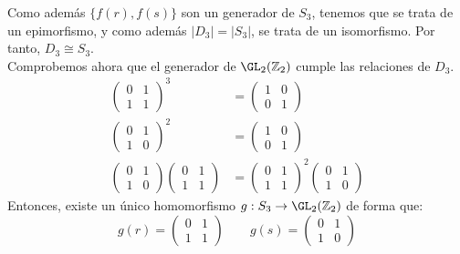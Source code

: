 \begin{ejercicio}
    Como además $\{f(r),f(s)\}$ son un generador de $S_3$, tenemos que se trata de un epimorfismo, y como además $|D_3|=|S_3|$, se trata de un isomorfismo. Por tanto, $D_3\cong S_3$.\\

    Comprobemos ahora que el generador de $\GL_2(\mathbb{Z}_2)$ cumple las relaciones de $D_3$.
    \begin{align*}
        {\left(\begin{array}{cc}
            0 & 1 \\
            1 & 1 
        \end{array}\right)}^{3} &= \left(\begin{array}{cc}
            1 & 0 \\
            0 & 1 
        \end{array}\right) \\
        {\left(\begin{array}{cc}
            0 & 1 \\
            1 & 0 
        \end{array}\right)}^2 &= \left(\begin{array}{cc}
            1 & 0 \\
            0 & 1 
        \end{array}\right) \\
        \left(\begin{array}{cc}
            0 & 1 \\
            1 & 0 
        \end{array}\right)\left(\begin{array}{cc}
            0 & 1 \\
            1 & 1 
            \end{array}\right) &= {\left(\begin{array}{cc}
            0 & 1 \\
            1 & 1 
        \end{array}\right)}^2 \left(\begin{array}{cc}
            0 & 1 \\
            1 & 0 
        \end{array}\right)
    \end{align*}
    Entonces, existe un único homomorfismo $g:S_3\to \GL_2(\mathbb{Z}_2)$ de forma que:
    \begin{equation*}
        g(r) = \left(\begin{array}{cc}
            0 & 1 \\
            1 & 1 
        \end{array}\right)\qquad 
        g(s) = \left(\begin{array}{cc}
            0 & 1 \\
            1 & 0 
        \end{array}\right) 
    \end{equation*}


\end{ejercicio}
